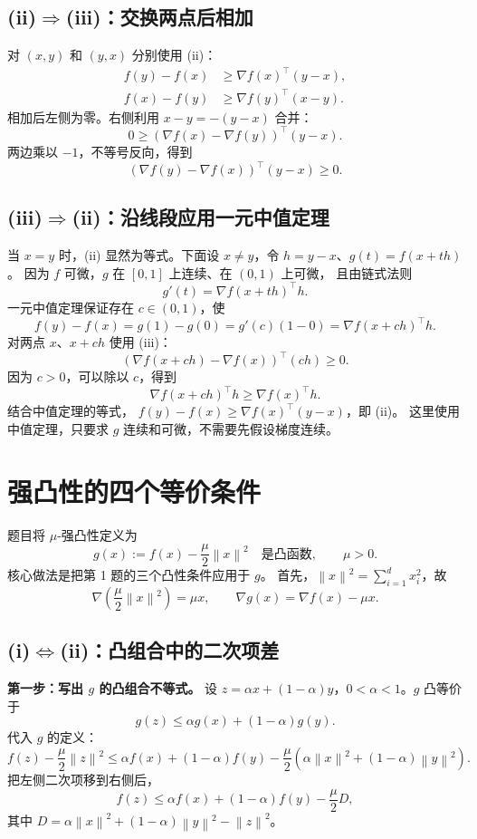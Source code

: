 \documentclass[UTF8,a4paper,11pt,fontset=fandol]{ctexart}
\newcommand{\norm}[1]{\left\lVert#1\right\rVert}
\begin{document}
\subsection*{(ii)$\Rightarrow$(iii)：交换两点后相加}
对 $(x,y)$ 和 $(y,x)$ 分别使用 (ii)：
\begin{align*}
 f(y)-f(x)&\geq\nabla f(x)^\top(y-x),\\
 f(x)-f(y)&\geq\nabla f(y)^\top(x-y).
\end{align*}
相加后左侧为零。右侧利用 $x-y=-(y-x)$ 合并：
\[
 0\geq(\nabla f(x)-\nabla f(y))^\top(y-x).
\]
两边乘以 $-1$，不等号反向，得到
\[
 (\nabla f(y)-\nabla f(x))^\top(y-x)\geq0.
\]

\subsection*{(iii)$\Rightarrow$(ii)：沿线段应用一元中值定理}
当 $x=y$ 时，(ii) 显然为等式。下面设 $x\ne y$，令
$h=y-x$、$g(t)=f(x+th)$。
因为 $f$ 可微，$g$ 在 $[0,1]$ 上连续、在 $(0,1)$ 上可微，
且由链式法则
\[
 g'(t)=\nabla f(x+th)^\top h.
\]
一元中值定理保证存在 $c\in(0,1)$，使
\[
 f(y)-f(x)=g(1)-g(0)=g'(c)(1-0)=\nabla f(x+ch)^\top h.
\]
对两点 $x$、$x+ch$ 使用 (iii)：
\[
 (\nabla f(x+ch)-\nabla f(x))^\top(ch)\geq0.
\]
因为 $c>0$，可以除以 $c$，得到
\[
 \nabla f(x+ch)^\top h\geq\nabla f(x)^\top h.
\]
结合中值定理的等式，
$f(y)-f(x)\geq\nabla f(x)^\top(y-x)$，即 (ii)。
这里使用中值定理，只要求 $g$ 连续和可微，不需要先假设梯度连续。

\section{强凸性的四个等价条件}
题目将 $\mu$-强凸性定义为
\[
 g(x):=f(x)-\frac\mu2\norm x^2\quad\text{是凸函数},\qquad\mu>0.
\]
核心做法是把第 1 题的三个凸性条件应用于 $g$。
首先，$\norm x^2=\sum_{i=1}^d x_i^2$，故
\[
 \nabla\left(\frac\mu2\norm x^2\right)=\mu x,
 \qquad\nabla g(x)=\nabla f(x)-\mu x.
\]

\subsection*{(i)$\Leftrightarrow$(ii)：凸组合中的二次项差}
\textbf{第一步：写出 $g$ 的凸组合不等式。}
设 $z=\alpha x+(1-\alpha)y$，$0<\alpha<1$。$g$ 凸等价于
\[
 g(z)\leq\alpha g(x)+(1-\alpha)g(y).
\]
代入 $g$ 的定义：
\[
 f(z)-\frac\mu2\norm z^2
 \leq\alpha f(x)+(1-\alpha)f(y)
 -\frac\mu2\left(\alpha\norm x^2+(1-\alpha)\norm y^2\right).
\]
把左侧二次项移到右侧后，
\[
 f(z)\leq\alpha f(x)+(1-\alpha)f(y)-\frac\mu2D,
\]
其中 $D=\alpha\norm x^2+(1-\alpha)\norm y^2-\norm z^2$。
\end{document}
